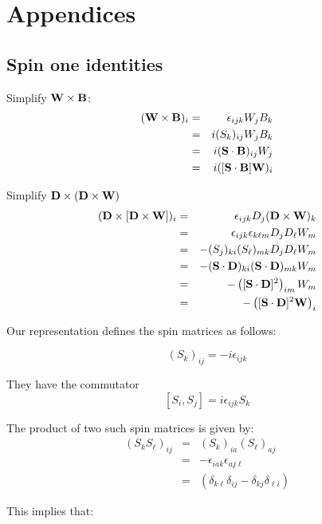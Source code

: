 \appendix

\chapter{Appendices}




\section{Spin one identities}

Simplify $ \mathbf{W} \times \mathbf{B}$:
\begin{eqnarray*}
(\mathbf{W} \times \mathbf{B})_i
	&=&	\epsilon_{ijk} W_j B_k	\\
	&=&	i(S_k)_{ij} W_j B_k\\
	&=&	i(\mathbf{S} \cdot \mathbf{B})_{ij} W_j	\\
	&=&	i([\mathbf{S} \cdot \mathbf{B}] \mathbf{W})_i
\end{eqnarray*}

Simplify $\mathbf{D} \times ( \mathbf{D} \times \mathbf{W} ) $
\begin{eqnarray*}
(\mathbf{D} \times [ \mathbf{D} \times \mathbf{W} ] )_i
	&=&	\epsilon_{ijk} D_j (\mathbf{D} \times \mathbf{W})_k	\\
	&=&	\epsilon_{ijk} \epsilon_{k\ell m} D_j D_\ell W_m	\\
	&=&	-(S_j)_{ki} (S_\ell)_{mk} D_j D_\ell W_m	\\
	&=&	-(\mathbf{S} \cdot \mathbf{D})_{ki} (\mathbf{S} \cdot \mathbf{D})_{mk} W_m	\\
	&=&	-\left( [\mathbf{S} \cdot \mathbf{D}]^2 \right)_{im} W_m	\\
	&=&	-\left( [\mathbf{S} \cdot \mathbf{D}]^2 \mathbf{W} \right)_i	\\
\end{eqnarray*}

Our representation defines the spin matrices as follows:

$${(S_k)}_{ij}=-i \epsilon_{ijk}$$

They have the commutator
$$	[S_i, S_j] = i \epsilon_{ijk} S_k $$

The product of two such spin matrices is given by:
\begin{eqnarray*}
{(S_k S_\ell)}_{ij} 
	& = & {(S_k)}_{ia} {(S_\ell)}_{aj} \\
	& = & -\epsilon_{iak} \epsilon_{aj\ell} \\
	& = & (\delta_{k\ell} \delta_{ij} - \delta_{kj} \delta_{\ell i} )
\end{eqnarray*}

This implies that:

